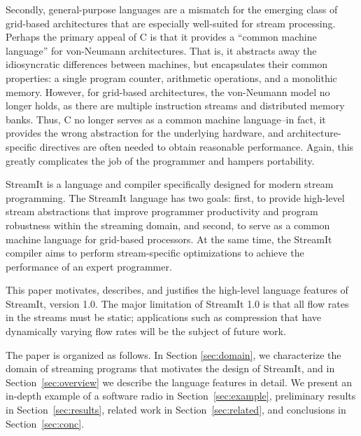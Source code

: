 Secondly, general-purpose languages are a mismatch for the emerging
class of grid-based architectures \cite{smartmemories,raw,trips} that
are especially well-suited for stream processing.  Perhaps the primary
appeal of C is that it provides a ``common machine language'' for
von-Neumann architectures.  That is, it abstracts away the
idiosyncratic differences between machines, but encapsulates their
common properties: a single program counter, arithmetic operations,
and a monolithic memory.  However, for grid-based architectures, the
von-Neumann model no longer holds, as there are multiple instruction
streams and distributed memory banks.  Thus, C no longer serves as a
common machine language--in fact, it provides the wrong abstraction
for the underlying hardware, and architecture-specific directives are
often needed to obtain reasonable performance.  Again, this greatly
complicates the job of the programmer and hampers portability.

StreamIt is a language and compiler specifically designed for modern
stream programming.  The StreamIt language has two goals: first, to
provide high-level stream abstractions that improve programmer
productivity and program robustness within the streaming domain, and
second, to serve as a common machine language for grid-based
processors.  At the same time, the StreamIt compiler aims to perform
stream-specific optimizations to achieve the performance of an expert
programmer.

This paper motivates, describes, and justifies the high-level language
features of StreamIt, version 1.0.  The major limitation of StreamIt
1.0 is that all flow rates in the streams must be static; applications
such as compression that have dynamically varying flow rates will be
the subject of future work.

The paper is organized as follows. In Section {\ref{sec:domain}}, we
characterize the domain of streaming programs that motivates the
design of StreamIt, and in Section~\ref{sec:overview} we describe the
language features in detail.  We present an in-depth example of a
software radio in Section~\ref{sec:example}, preliminary results in
Section~\ref{sec:results}, related work in Section~\ref{sec:related},
and conclusions in Section~\ref{sec:conc}.


